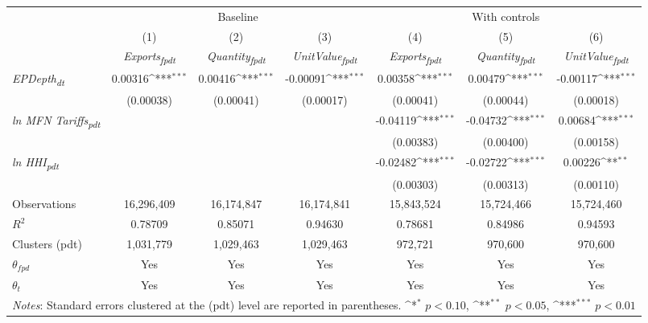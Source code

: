 {
\def\sym#1{\ifmmode^{#1}\else\(^{#1}\)\fi}
\begin{tabular}{l*{6}{c}}
\toprule
&\multicolumn{3}{c}{Baseline}&\multicolumn{3}{c}{With controls}\\\cmidrule(lr){2-4}\cmidrule(lr){5-7}
&(1)&(2)&(3)&(4)&(5)&(6)\\
&\textit{Exports\textsubscript{fpdt}}&\textit{Quantity\textsubscript{fpdt}}&\textit{UnitValue\textsubscript{fpdt}}&\textit{Exports\textsubscript{fpdt}}&\textit{Quantity\textsubscript{fpdt}}&\textit{UnitValue\textsubscript{fpdt}}\\
\midrule
\textit{EPDepth\textsubscript{dt}} & 0.00316\sym{***} & 0.00416\sym{***} & -0.00091\sym{***} & 0.00358\sym{***} & 0.00479\sym{***} & -0.00117\sym{***}\\
 & (0.00038) & (0.00041) & (0.00017) & (0.00041) & (0.00044) & (0.00018)\\
\addlinespace
\textit{ln MFN Tariffs\textsubscript{pdt}} &  &  &  & -0.04119\sym{***} & -0.04732\sym{***} & 0.00684\sym{***}\\
 &  &  &  & (0.00383) & (0.00400) & (0.00158)\\
\addlinespace
\textit{ln HHI\textsubscript{pdt}} &  &  &  & -0.02482\sym{***} & -0.02722\sym{***} & 0.00226\sym{**}\\
 &  &  &  & (0.00303) & (0.00313) & (0.00110)\\
\midrule
Observations & 16,296,409 & 16,174,847 & 16,174,841 & 15,843,524 & 15,724,466 & 15,724,460\\
$R^{2}$ & 0.78709 & 0.85071 & 0.94630 & 0.78681 & 0.84986 & 0.94593\\
Clusters (pdt) & 1,031,779 & 1,029,463 & 1,029,463 & 972,721 & 970,600 & 970,600\\
$\theta_{fpd}$ & Yes & Yes & Yes & Yes & Yes & Yes\\
$\theta_{t}$ & Yes & Yes & Yes & Yes & Yes & Yes\\
\bottomrule
\multicolumn{7}{l}{\footnotesize \textit{Notes}: Standard errors clustered at the (pdt) level are reported in parentheses. \sym{*} \(p<0.10\), \sym{**} \(p<0.05\), \sym{***} \(p<0.01\)}\\
\end{tabular}
}
